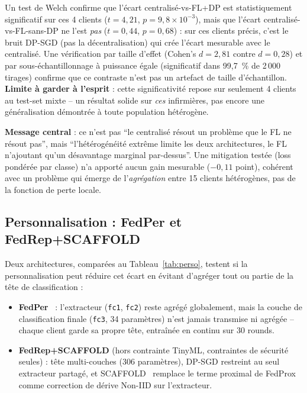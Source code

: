 \documentclass{acmart}
\begin{document}
Un test de Welch confirme que l'écart centralisé-vs-FL+DP est statistiquement
significatif sur ces 4 clients ($t=4{,}21$, $p=9{,}8\times10^{-3}$), mais que
l'écart centralisé-vs-FL-sans-DP ne l'est \emph{pas} ($t=0{,}44$, $p=0{,}68$) : sur ces
clients précis, c'est le bruit DP-SGD (pas la décentralisation) qui crée l'écart
mesurable avec le centralisé. Une vérification par taille d'effet (Cohen's $d=2{,}81$
contre $d=0{,}28$) et par sous-échantillonnage à puissance égale (significatif dans
99,7~\% de 2\,000 tirages) confirme que ce contraste n'est pas un artefact de taille
d'échantillon. \textbf{Limite à garder à l'esprit} : cette significativité repose sur
seulement 4 clients au test-set mixte -- un résultat solide sur \emph{ces}
infirmières, pas encore une généralisation démontrée à toute population hétérogène.

\textbf{Message central} : ce n'est pas ``le centralisé résout un problème que le FL
ne résout pas'', mais ``l'hétérogénéité extrême limite les deux architectures, le FL
n'ajoutant qu'un désavantage marginal par-dessus''. Une mitigation testée (loss
pondérée par classe) n'a apporté aucun gain mesurable ($-0{,}11$ point), cohérent avec
un problème qui émerge de l'\emph{agrégation} entre 15 clients hétérogènes, pas de la
fonction de perte locale.

\subsection{Personnalisation : FedPer et FedRep+SCAFFOLD}

Deux architectures, comparées au Tableau~\ref{tab:perso}, testent si la personnalisation peut réduire cet écart en évitant
d'agréger tout ou partie de la tête de classification :

\begin{itemize}
\item \textbf{FedPer}~\cite{arivazhagan2019federated} : l'extracteur (\texttt{fc1},
\texttt{fc2}) reste agrégé globalement, mais la couche de classification finale
(\texttt{fc3}, 34 paramètres) n'est jamais transmise ni agrégée -- chaque client garde
sa propre tête, entraînée en continu sur 30 rounds.
\item \textbf{FedRep+SCAFFOLD} (hors contrainte TinyML, contraintes de sécurité
seules) : tête multi-couches (306 paramètres), DP-SGD restreint au seul extracteur
partagé, et SCAFFOLD~\cite{karimireddy2020scaffold} remplace le terme proximal de
FedProx comme correction de dérive Non-IID sur l'extracteur.
\end{itemize}
\end{document}
